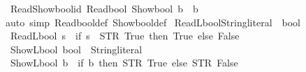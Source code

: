 \begin{isabellebody}
\ Read{\isacharunderscore}{\kern0pt}Show{\isacharunderscore}{\kern0pt}bool{\isacharunderscore}{\kern0pt}id{\isacharcolon}{\kern0pt}\ {\isacartoucheopen}Read\isactrlsub b\isactrlsub o\isactrlsub o\isactrlsub l\ {\isacharparenleft}{\kern0pt}Show\isactrlsub b\isactrlsub o\isactrlsub o\isactrlsub l\ b{\isacharparenright}{\kern0pt}\ {\isacharequal}{\kern0pt}\ b{\isacartoucheclose}\isanewline
%
\isadelimproof
\ \ %
\endisadelimproof
%
\isatagproof
{}\isamarkupfalse%
{\isacharparenleft}{\kern0pt}auto\ simp{\isacharcolon}{\kern0pt}\ Read\isactrlsub b\isactrlsub o\isactrlsub o\isactrlsub l{\isacharunderscore}{\kern0pt}def\ Show\isactrlsub b\isactrlsub o\isactrlsub o\isactrlsub l{\isacharunderscore}{\kern0pt}def{\isacharparenright}{\kern0pt}%
\endisatagproof
{\isafoldproof}%
%
\isadelimproof
\isanewline
%
\endisadelimproof
\isanewline
{}\isamarkupfalse%
\ ReadL\isactrlsub b\isactrlsub o\isactrlsub o\isactrlsub l{\isacharcolon}{\kern0pt}{\isacharcolon}{\kern0pt}{\isacartoucheopen}String{\isachardot}{\kern0pt}literal\ {\isasymRightarrow}\ bool{\isacartoucheclose}\ {\isacharparenleft}{\kern0pt}{\isacartoucheopen}{\isasymlfloor}{\isacharunderscore}{\kern0pt}{\isasymrfloor}{\isacartoucheclose}{\isacharparenright}{\kern0pt}\ \ \isanewline
\ {\isacartoucheopen}ReadL\isactrlsub b\isactrlsub o\isactrlsub o\isactrlsub l\ s\ {\isacharequal}{\kern0pt}\ {\isacharparenleft}{\kern0pt}if\ s\ {\isacharequal}{\kern0pt}\ STR\ {\isacharprime}{\kern0pt}{\isacharprime}{\kern0pt}True{\isacharprime}{\kern0pt}{\isacharprime}{\kern0pt}\ then\ True\ else\ False{\isacharparenright}{\kern0pt}{\isacartoucheclose}\isanewline
{}\isamarkupfalse%
\ ShowL\isactrlsub b\isactrlsub o\isactrlsub o\isactrlsub l{\isacharcolon}{\kern0pt}{\isacharcolon}{\kern0pt}\ {\isacartoucheopen}bool\ {\isasymRightarrow}\ String{\isachardot}{\kern0pt}literal{\isacartoucheclose}\ {\isacharparenleft}{\kern0pt}{\isacartoucheopen}{\isasymlceil}{\isacharunderscore}{\kern0pt}{\isasymrceil}{\isacartoucheclose}{\isacharparenright}{\kern0pt}\ \isanewline
\ {\isacartoucheopen}ShowL\isactrlsub b\isactrlsub o\isactrlsub o\isactrlsub l\ b\ {\isacharequal}{\kern0pt}\ {\isacharparenleft}{\kern0pt}if\ b\ then\ STR\ {\isacharprime}{\kern0pt}{\isacharprime}{\kern0pt}True{\isacharprime}{\kern0pt}{\isacharprime}{\kern0pt}\ else\ STR\ {\isacharprime}{\kern0pt}{\isacharprime}{\kern0pt}False{\isacharprime}{\kern0pt}{\isacharprime}{\kern0pt}{\isacharparenright}{\kern0pt}{\isacartoucheclose}\isanewline
{}\isamarkupfalse%
\ \isanewline

\end{isabellebody}
